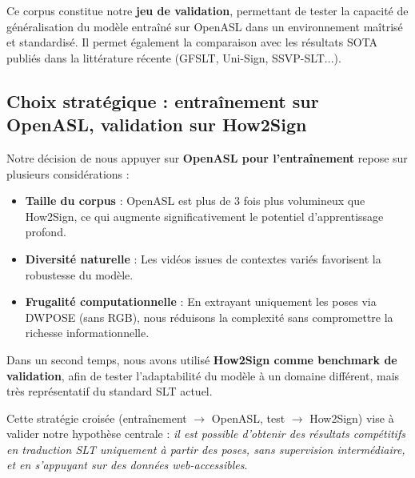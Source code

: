 Ce corpus constitue notre \textbf{jeu de validation}, permettant de tester la capacité de généralisation du modèle entraîné sur OpenASL dans un environnement maîtrisé et standardisé. Il permet également la comparaison avec les résultats SOTA publiés dans la littérature récente (GFSLT, Uni-Sign, SSVP-SLT...).

\subsection*{Choix stratégique : entraînement sur OpenASL, validation sur How2Sign}

Notre décision de nous appuyer sur \textbf{OpenASL pour l’entraînement} repose sur plusieurs considérations :
\begin{itemize}
    \item \textbf{Taille du corpus} : OpenASL est plus de 3 fois plus volumineux que How2Sign, ce qui augmente significativement le potentiel d’apprentissage profond.
    \item \textbf{Diversité naturelle} : Les vidéos issues de contextes variés favorisent la robustesse du modèle.
    \item \textbf{Frugalité computationnelle} : En extrayant uniquement les poses via DWPOSE (sans RGB), nous réduisons la complexité sans compromettre la richesse informationnelle.
\end{itemize}

Dans un second temps, nous avons utilisé \textbf{How2Sign comme benchmark de validation}, afin de tester l’adaptabilité du modèle à un domaine différent, mais très représentatif du standard SLT actuel.

Cette stratégie croisée (entraînement $\rightarrow$ OpenASL, test $\rightarrow$ How2Sign) vise à valider notre hypothèse centrale : \textit{il est possible d’obtenir des résultats compétitifs en traduction SLT uniquement à partir des poses, sans supervision intermédiaire, et en s'appuyant sur des données web-accessibles}.
